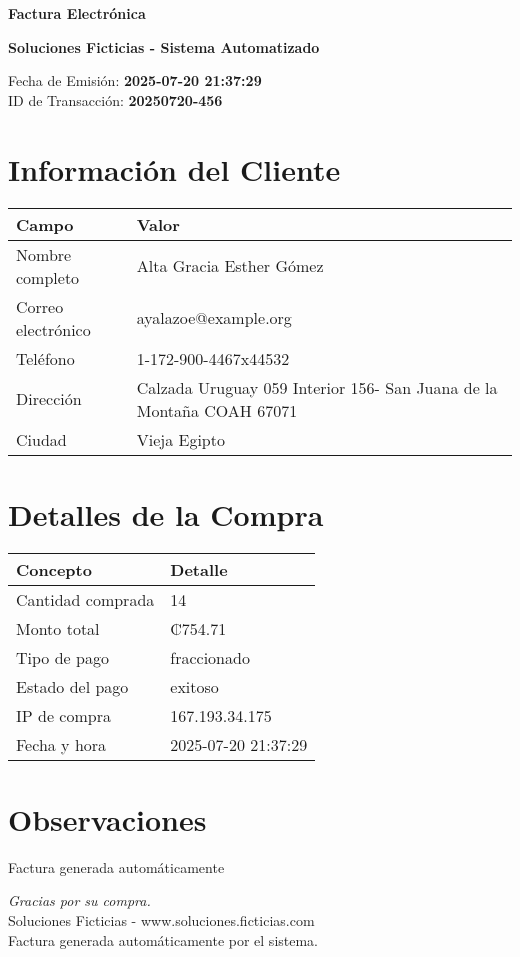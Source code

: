 \documentclass[12pt]{article}
\begin{document}
\begin{center}
    \Huge \textbf{Factura Electrónica}

    \vspace{0.3cm}
    \large \textbf{Soluciones Ficticias - Sistema Automatizado}

    \vspace{0.5cm}
    \normalsize Fecha de Emisión: \textbf{2025-07-20 21:37:29} \\
    ID de Transacción: \textbf{20250720-456} \\
\end{center}

\vspace{1cm}

\section*{Información del Cliente}
\begin{tabularx}{\textwidth}{L{4cm} L{12cm}}
\textbf{Campo} & \textbf{Valor} \\
\hline
Nombre completo & Alta  Gracia Esther Gómez \\
Correo electrónico & ayalazoe@example.org \\
Teléfono & 1-172-900-4467x44532 \\
Dirección & Calzada Uruguay 059 Interior 156- San Juana de la Montaña  COAH 67071 \\
Ciudad & Vieja Egipto \\
\end{tabularx}

\vspace{0.8cm}

\section*{Detalles de la Compra}
\begin{tabularx}{\textwidth}{L{6cm} L{10cm}}
\textbf{Concepto} & \textbf{Detalle} \\
\hline
Cantidad comprada & 14 \\
Monto total & ₡754.71 \\
Tipo de pago & fraccionado \\
Estado del pago & exitoso \\
IP de compra & 167.193.34.175 \\
Fecha y hora & 2025-07-20 21:37:29 \\
\end{tabularx}

\vspace{1.5cm}

\section*{Observaciones}
Factura generada automáticamente

\vfill

\begin{center}
    \textit{Gracias por su compra.} \\
    Soluciones Ficticias - www.soluciones.ficticias.com \\
    Factura generada automáticamente por el sistema.
\end{center}
\end{document}
